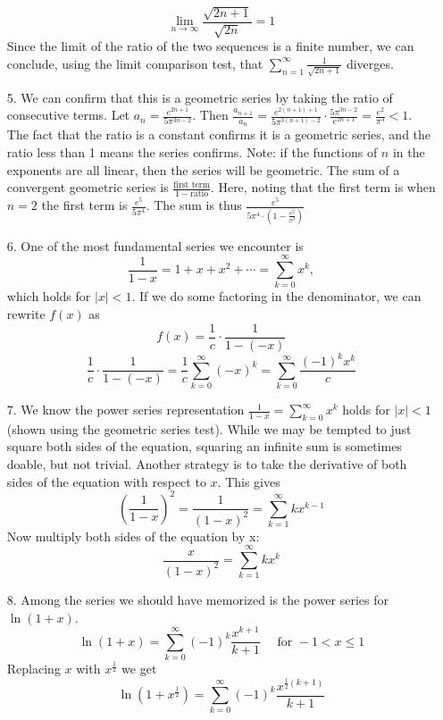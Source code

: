 \documentclass{article}
\begin{document}
\begin{enumerate}
        \[\lim_{n\to\infty} \frac{\sqrt{2n+1}}{\sqrt{2n}} = 1 \]
        Since the limit of the ratio of the two sequences is a finite number, we can conclude, using the limit comparison test, that $\sum_{n=1}^\infty \frac{1}{\sqrt{2n+1}}$ diverges.
        \item[5.] We can confirm that this is a geometric series by taking the ratio of consecutive terms. Let $\displaystyle a_n = \frac{e^{2n+1}}{5\pi^{3n-2}}$. Then $\displaystyle \frac{a_{n+1}}{a_n} = \frac{e^{2(n+1)+1}}{5\pi^{3(n+1)-2}}\cdot \frac{5\pi^{3n-2}}{e^{2n+1}}=\frac{e^2}{\pi^3}<1$. The fact that the ratio is a constant confirms it is a geometric series, and the ratio less than 1 means the series confirms. Note: if the functions of $n$ in the exponents are all linear, then the series will be geometric. The sum of a convergent geometric series is $\frac{\text{first term}}{1-\text{ratio}}$. Here, noting that the first term is when $n=2$ the first term is $\frac{e^5}{5\pi^4}$. The sum is thus $\frac{e^5}{5\pi^4\cdot(1-\frac{e^2}{\pi^3})}$
        \item[6.] One of the most fundamental series we encounter is \[\frac{1}{1-x} = 1+x+x^2+\cdots = \sum_{k=0}^\infty x^k,\]
        which holds for $|x|<1$. If we do some factoring in the denominator, we can rewrite $f(x)$ as
        \[f(x) = \frac{1}{c}\cdot \frac{1}{1-(-x)}\]
        \[ \frac{1}{c}\cdot \frac{1}{1-(-x)} = \frac{1}{c}\sum_{k=0}^\infty (-x)^k = \sum_{k=0}^\infty \frac{(-1)^k x^k}{c} \]
        \item[7.] We know the power series representation $\frac{1}{1-x} = \sum_{k=0}^\infty x^k$ holds for $|x| < 1$ (shown using the geometric series test). While we may be tempted to just square both sides of the equation, squaring an infinite sum is sometimes doable, but not trivial. Another strategy is to take the derivative of both sides of the equation with respect to $x$. This gives
        $$\left(\frac{1}{1-x}\right)^2 = \frac{1}{(1-x)^2}=  \sum_{k=1}^\infty kx^{k-1}$$
        Now multiply both sides of the equation by x:
         $$\frac{x}{(1-x)^2} =  \sum_{k=1}^\infty kx^k$$
        \item[8.] Among the series we should have memorized is the power series for $\ln(1+x)$.
        \[\ln(1+x) = \sum_{k=0}^\infty (-1)^{k} \frac{x^{k+1}}{k+1} \quad \text{ for } -1<x\le 1\]
 Replacing $x$ with $x^{\frac{1}{2}}$ we get
         \[\ln(1+x^\frac{1}{2}) = \sum_{k=0}^\infty (-1)^{k} \frac{x^{\frac{1}{2}(k+1)}}{k+1} \]    
    \end{enumerate}
\end{document}
